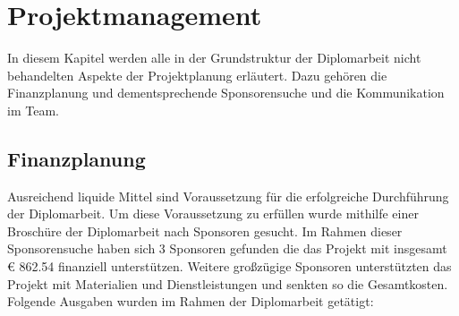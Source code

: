 \chapter{Projektmanagement}
In diesem Kapitel werden alle in der Grundstruktur der Diplomarbeit nicht behandelten Aspekte der Projektplanung erläutert. Dazu gehören die Finanzplanung und dementsprechende Sponsorensuche und die Kommunikation im Team. 
\section{Finanzplanung}
Ausreichend liquide Mittel sind Voraussetzung für die erfolgreiche Durchführung der Diplomarbeit. Um diese Voraussetzung zu erfüllen wurde mithilfe einer Broschüre der Diplomarbeit nach Sponsoren gesucht. Im Rahmen dieser Sponsorensuche haben sich 3 Sponsoren gefunden die das Projekt mit insgesamt € 862.54 finanziell unterstützen. Weitere großzügige Sponsoren unterstützten das Projekt mit Materialien und Dienstleistungen und senkten so die Gesamtkosten. Folgende Ausgaben wurden im Rahmen der Diplomarbeit getätigt:

